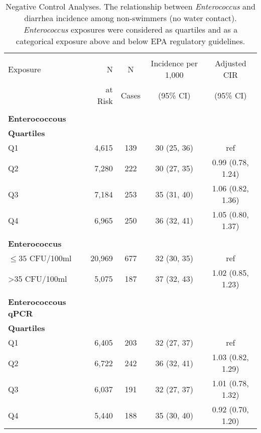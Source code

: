 \documentclass[12pt]{article}\usepackage[]{graphicx}\usepackage[]{color}
\begin{document}
\begin{table}[h!tb]
\begin{center}
\begin{footnotesize}
\begin{minipage}{0.9\textwidth}
\caption{Negative Control Analyses. The relationship between \emph{Enterococcus} and diarrhea incidence among non-swimmers (no water contact). \emph{Enterococcus} exposures were considered as quartiles and as a categorical exposure above and below EPA regulatory guidelines. \label{tab:negcontrol}}
\end{minipage}
\begin{tabular}{l rc c c}
& \\
Exposure & N        & N      & Incidence per 1,000 & Adjusted CIR \\
         & at Risk  & Cases  & (95\% CI)  & (95\% CI)    \\
\hline
& \\
\textbf{Enterococcous} \\
\textbf{Quartiles} \\
 Q1 & 4,615 &   139 & 30 (25, 36) & ref \\ 
  Q2 & 7,280 &   222 & 30 (27, 35) & 0.99 (0.78, 1.24) \\ 
  Q3 & 7,184 &   253 & 35 (31, 40) & 1.06 (0.82, 1.36) \\ 
  Q4 & 6,965 &   250 & 36 (32, 41) & 1.05 (0.80, 1.37) \\ 
  
& \\
\textbf{Enterococcus} \\
 $\leq35$ CFU/100ml & 20,969 &    677 & 32 (30, 35) & ref \\ 
  >35 CFU/100ml &  5,075 &    187 & 37 (32, 43) & 1.02 (0.85, 1.23) \\ 
  
& \\
\textbf{Enterococcous qPCR} \\
\textbf{Quartiles} \\
 Q1 & 6,405 &   203 & 32 (27, 37) & ref \\ 
  Q2 & 6,722 &   242 & 36 (32, 41) & 1.03 (0.82, 1.29) \\ 
  Q3 & 6,037 &   191 & 32 (27, 37) & 1.01 (0.78, 1.32) \\ 
  Q4 & 5,440 &   188 & 35 (30, 40) & 0.92 (0.70, 1.20) \\ 
  

\end{tabular}
\end{footnotesize}
\end{center}
\end{table}
\end{document}
